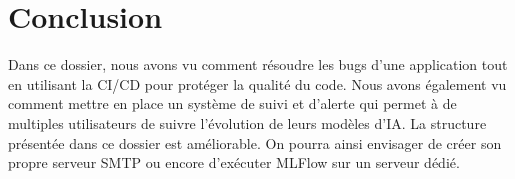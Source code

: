 \documentclass[french]{article}
\begin{document}
    \section{Conclusion}
    Dans ce dossier, nous avons vu comment résoudre les bugs d'une application tout en utilisant la CI/CD pour protéger la qualité du code. Nous avons également vu comment mettre en place un système de suivi et d'alerte qui permet à de multiples utilisateurs de suivre l'évolution de leurs modèles d'IA. La structure présentée dans ce dossier est améliorable. On pourra ainsi envisager de créer son propre serveur SMTP ou encore d'exécuter MLFlow sur un serveur dédié.
\end{document}
